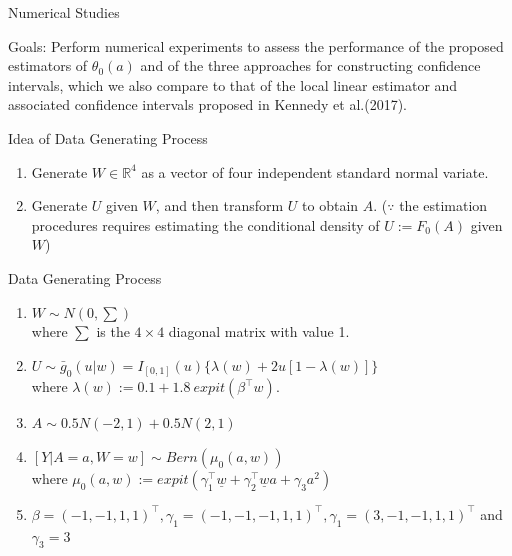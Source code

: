 \documentclass{beamer}
\newcommand{\R}{\mathbb{R}}
\begin{document}
\begin{frame}{Numerical Studies}

	Goals: Perform numerical experiments to assess the performance of the proposed estimators of $\theta_0(a)$ and of the three approaches for constructing confidence intervals, which we also compare to that of
the local linear estimator and associated confidence intervals proposed in Kennedy et al.(2017).

\begin{block}{Idea of Data Generating Process}
	\begin{enumerate}
	\item	Generate $W \in \R^4$ as a vector of four independent standard normal variate.
	\item	Generate $U$ given $W$, and then transform $U$ to obtain $A$. ($\because$ the estimation procedures requires estimating the conditional density of $U:=F_0(A)$ given $W$)
	\end{enumerate}

\end{block}

\end{frame}


\begin{frame}{Data Generating Process}

	\begin{enumerate}
	\item	$W \sim N(0,\sum)$
	\\where $\sum$ is the $4\times4$ diagonal matrix with value 1.
	\item		$U \sim \bar{g}_0(u|w)=I_{[0,1]}(u)\lbrace \lambda(w) + 2u[1-\lambda(w)]\rbrace$
	\\where $\lambda(w):=0.1+1.8 \ expit(\beta^{\top}w).$
	\item	$A \sim 0.5N(-2,1)+0.5N(2,1)$
	\item	$[Y|A=a,W=w] \sim Bern(\mu_0(a,w))$
	\\where $\mu_0(a,w):=expit(\gamma^{\top}_1 \underline{w} + \gamma^{\top}_2 \underline{w}a + \gamma_3 a^2)$
	\item $\beta = (-1,-1,1,1)^{\top}, \gamma_1 = (-1,-1,-1,1,1)^{\top}, \gamma_1 = (3,-1,-1,1,1)^{\top}$ and $\gamma_3=3$
	\end{enumerate}

\end{frame}

\end{document}
